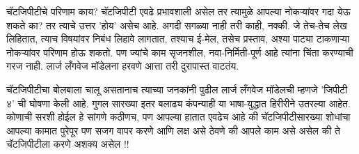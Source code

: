 चॅटजिपीटीचे परिणाम काय?
चॅटजिपीटी एवढे प्रभावशाली असेल तर त्यामुळे आपल्या नोकऱ्यांवर गदा येऊ शकते का? तर त्याचे उत्तर 'होय' असेच आहे. अगदी सगळ्या नाही तरी काही, नक्की. जे तेच-तेच लेख लिहितात, त्याच विषयांवर निबंध लिहावे लागतात, तश्याच ई-मेल, तसेच प्रस्ताव, अश्या पाट्या टाकणाऱ्या नोकऱ्यांवर परिणाम होऊ शकतो. पण ज्यांचे काम सृजनशील, नवा-निर्मिती-पूर्ण आहे त्यांना चिंता करण्याची गरज नाही. लार्ज लँगवेज मॉडेलना हरवणे आत्ता तरी दुरापास्त वाटतंय.

चॅटजिपीटीचा बोलबाला चालू असतानाच त्याच्या जनकांनी पुढील लार्ज लँगवेज मॉडेलची म्हणजे 'जिपीटी ४' ची घोषणा केली आहे. गुगल सारख्या इतर बलाढ्य कंपन्याही या भाषा-युद्धात हिरीरीने उतरल्या आहेत. कोणाची सरशी होईल हे सांगणे कठीणच, पण आपल्या हातात एवढेच आहे की चॅटजिपीटीसारख्या शोधांचा आपल्या कामात पुरेपूर पण सजग वापर करणे आणि लक्ष असे ठेवणे की आपले काम असे असेल की ते चॅटजिपीटीला करणे अशक्य असेल !!